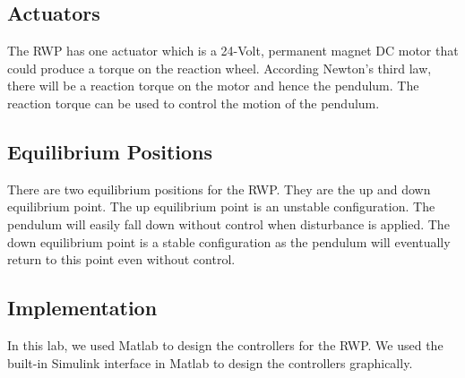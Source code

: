 \subsection{Actuators}
The RWP has one actuator which is a 24-Volt, permanent magnet DC motor that could produce a torque on the reaction wheel. According Newton’s third law, there will be a reaction torque on the motor and hence the pendulum. The reaction torque can be used to control the motion of the pendulum.
\subsection{Equilibrium Positions}
There are two equilibrium positions for the RWP. They are the up and down equilibrium point. The up equilibrium point is an unstable configuration. The pendulum will easily fall down without control when disturbance is applied. The down equilibrium point is a stable configuration as the pendulum will eventually return to this point even without control.
\subsection{Implementation}
In this lab, we used Matlab to design the controllers for the RWP. We used the built-in Simulink interface in Matlab to design the controllers graphically.